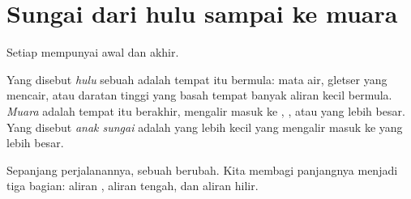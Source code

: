 \section{Sungai dari hulu sampai ke muara}

Setiap  mempunyai awal dan akhir.

\begin{definition}\label{def:g5:water-shapes-the-land:source-mouth}
Yang disebut \emph{hulu} sebuah  adalah tempat
 itu bermula: mata air, gletser yang mencair, atau daratan tinggi yang
basah tempat banyak aliran kecil bermula. \emph{Muara}
 adalah tempat  itu berakhir, mengalir masuk ke , ,
atau  yang lebih besar. Yang disebut
\emph{anak sungai} adalah  yang lebih kecil yang
mengalir masuk ke  yang lebih besar.
\end{definition}

Sepanjang perjalanannya, sebuah  berubah. Kita membagi panjangnya
menjadi tiga bagian: aliran , aliran tengah, dan aliran hilir.

